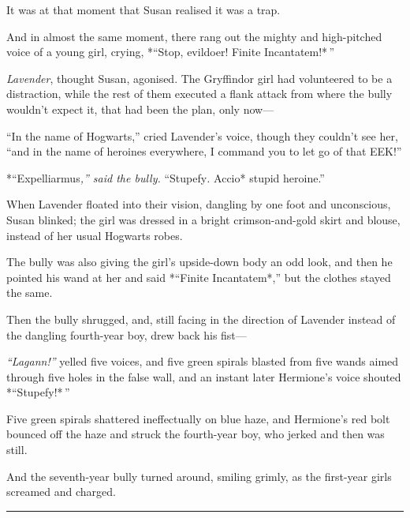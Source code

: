 It was at that moment that Susan realised it was a trap.

And in almost the same moment, there rang out the mighty and
high-pitched voice of a young girl, crying, *``Stop, evildoer! Finite
Incantatem!* ''

\emph{Lavender}, thought Susan, agonised. The Gryffindor girl had
volunteered to be a distraction, while the rest of them executed a flank
attack from where the bully wouldn't expect it, that had been the plan,
only now---

``In the name of Hogwarts,'' cried Lavender's voice, though they
couldn't see her, ``and in the name of heroines everywhere, I command
you to let go of that EEK!''

*``Expelliarmus\emph{,'' said the bully. }``Stupefy\emph{. }Accio*
stupid heroine.''

When Lavender floated into their vision, dangling by one foot and
unconscious, Susan blinked; the girl was dressed in a bright
crimson-and-gold skirt and blouse, instead of her usual Hogwarts robes.

The bully was also giving the girl's upside-down body an odd look, and
then he pointed his wand at her and said *``Finite Incantatem*,'' but
the clothes stayed the same.

Then the bully shrugged, and, still facing in the direction of Lavender
instead of the dangling fourth-year boy, drew back his fist---

\emph{``Lagann!''} yelled five voices, and five green spirals blasted
from five wands aimed through five holes in the false wall, and an
instant later Hermione's voice shouted *``Stupefy!* ''

Five green spirals shattered ineffectually on blue haze, and Hermione's
red bolt bounced off the haze and struck the fourth-year boy, who jerked
and then was still.

And the seventh-year bully turned around, smiling grimly, as the
first-year girls screamed and charged.

\begin{center}\rule{3in}{0.4pt}\end{center}

